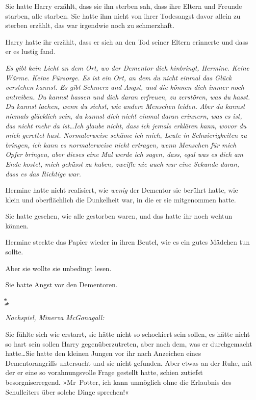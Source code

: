 {Sie hatte Harry erzählt, dass sie ihn sterben sah, dass ihre Eltern und Freunde starben, alle starben. Sie hatte ihm nicht von ihrer Todesangst davor allein zu sterben erzählt, das war irgendwie noch zu schmerzhaft.

Harry hatte ihr erzählt, dass er sich an den Tod seiner Eltern erinnerte und dass er es lustig fand.

\emph{Es gibt kein Licht an dem Ort, wo der Dementor dich hinbringt, Hermine. Keine Wärme. Keine Fürsorge. Es ist ein Ort, an dem du nicht einmal das Glück verstehen kannst. Es gibt Schmerz und Angst, und die können dich immer noch antreiben. Du kannst hassen und dich daran erfreuen, zu zerstören, was du hasst. Du kannst lachen, wenn du siehst, wie andere Menschen leiden. Aber du kannst niemals glücklich sein, du kannst dich nicht einmal daran erinnern, was es ist, das nicht mehr da ist…Ich glaube nicht, dass ich jemals erklären kann, wovor du mich gerettet hast. Normalerweise schäme ich mich, Leute in Schwierigkeiten zu bringen, ich kann es normalerweise nicht ertragen, wenn Menschen für mich Opfer bringen, aber dieses eine Mal werde ich sagen, dass, egal was es dich am Ende kostet, mich geküsst zu haben, zweifle nie auch nur eine Sekunde daran, dass es das Richtige war.}

Hermine hatte nicht realisiert, wie \emph{wenig} der Dementor sie berührt hatte, wie klein und oberflächlich die Dunkelheit war, in die er sie mitgenommen hatte.

Sie hatte gesehen, wie alle gestorben waren, und das hatte ihr noch wehtun können.

Hermine steckte das Papier wieder in ihren Beutel, wie es ein gutes Mädchen tun sollte.

Aber sie wollte sie unbedingt lesen.

Sie hatte Angst vor den Dementoren.

͙⃰⁎

\emph{Nachspiel, Minerva McGonagall:}

Sie fühlte sich wie erstarrt, sie hätte nicht so schockiert sein sollen, es hätte nicht so hart sein sollen Harry gegenüberzutreten, aber nach dem, was er durchgemacht hatte…Sie hatte den kleinen Jungen vor ihr nach Anzeichen eines Dementorangriffs untersucht und sie nicht gefunden. Aber etwas an der Ruhe, mit der er eine so vorahnungsvolle Frage gestellt hatte, schien zutiefst besorgniserregend. »Mr~Potter, ich kann unmöglich ohne die Erlaubnis des Schulleiters über solche Dinge sprechen!«

}
